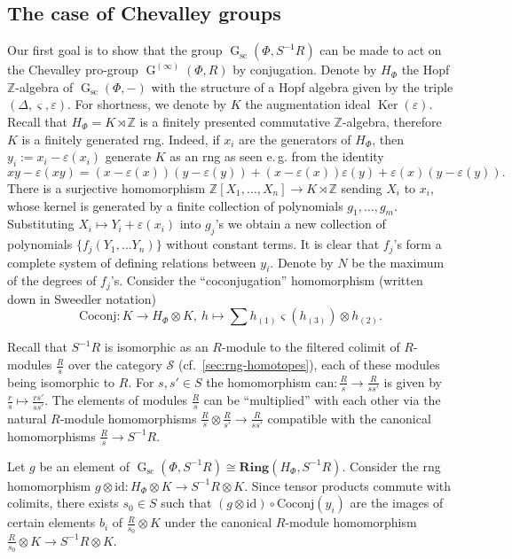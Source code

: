 \documentclass[oneside, 11pt]{amsart}
\numberwithin{equation}{section}
\theoremstyle{definition}
\theoremstyle{remark}
\DeclareMathOperator\Ker{Ker}
\DeclareMathOperator\GG{G}
\newcommand{\ZZ}{\mathbb{Z}}
\begin{document}
\subsection{The case of Chevalley groups} \label{sec:local-Chevalley}
Our first goal is to show that the group \(\GG_{\mathrm{sc}}(\Phi, S^{-1} R)\) can be made to act on the Chevalley pro-group \(\GG^{(\infty)}(\Phi, R)\) by conjugation. Denote by \(H_\Phi\) the Hopf \(\ZZ\)-algebra of \(\GG_{\mathrm{sc}}(\Phi, -)\) with the structure of a Hopf algebra given by the triple $(\Delta, \varsigma, \varepsilon)$. 
For shortness, we denote by $K$ the augmentation ideal $\Ker(\varepsilon)$. Recall that \(H_\Phi= K \rtimes \ZZ\) is a finitely presented commutative \(\ZZ\)-algebra, therefore $K$ is a finitely generated rng. Indeed, if $x_i$ are the generators of $H_\Phi$, then $y_i:=x_i - \varepsilon(x_i)$ generate $K$ as an rng as seen e.\,g. from the identity
$$xy - \varepsilon(xy) = (x - \varepsilon(x)) (y - \varepsilon(y)) + (x - \varepsilon(x)) \varepsilon(y) + \varepsilon(x) (y - \varepsilon(y)).$$
There is a surjective homomorphism $\ZZ[X_1, \ldots, X_n] \to K \rtimes \ZZ$ sending $X_i$ to $x_i$,
whose kernel is generated by a finite collection of polynomials \(g_1, \ldots, g_m\).
Substituting $X_i \mapsto Y_i + \varepsilon(x_i)$ into $g_j$'s we obtain a new collection of polynomials $\{f_j(Y_1,\ldots Y_n)\}$ without constant terms.
It is clear that $f_j$'s form a complete system of defining relations between $y_i$. Denote by \(N\) be the maximum of the degrees of \(f_j\)'s.
Consider the ``coconjugation'' homomorphism (written down in Sweedler notation)
\[\mathrm{Coconj} \colon K \to H_\Phi \otimes K,\ h \mapsto \sum h_{(1)} \varsigma(h_{(3)}) \otimes h_{(2)}.\]

Recall that \(S^{-1} R\) is isomorphic as an $R$-module to the filtered colimit of \(R\)-modules \(\frac Rs\) over the category $\mathcal{S}$ (cf.~\cref{sec:rng-homotopes}), each of these modules being isomorphic to $R$. For $s, s' \in S$ the homomorphism \(\mathrm{can}\colon \frac R{s} \to \frac R{ss'}\) is given by $\tfrac{r}{s} \mapsto \tfrac{rs'}{ss'}$. The elements of modules $\frac Rs$ can be ``multiplied'' with each other via the natural $R$-module homomorphisms $\frac R s \otimes \frac R {s'} \to \frac R {ss'}$ compatible with the canonical homomorphisms $\frac R s \to S^{-1}R$.

Let $g$ be an element of $\GG_{\mathrm{sc}}(\Phi, S^{-1} R) \cong \mathbf{Ring}(H_\Phi, S^{-1}R)$. Consider the rng homomorphism \(g \otimes \mathrm{id} \colon H_\Phi \otimes K \to S^{-1} R \otimes K\).
Since tensor products commute with colimits, there exists \(s_0 \in S\) such that \((g \otimes \mathrm{id})\circ \mathrm{Coconj}(y_i)\) are the images of certain elements $b_i$ of $\frac R{s_0} \otimes K$ under the canonical $R$-module homomorphism $ \tfrac R{s_0} \otimes K \to S^{-1}R \otimes K.$
\end{document}
